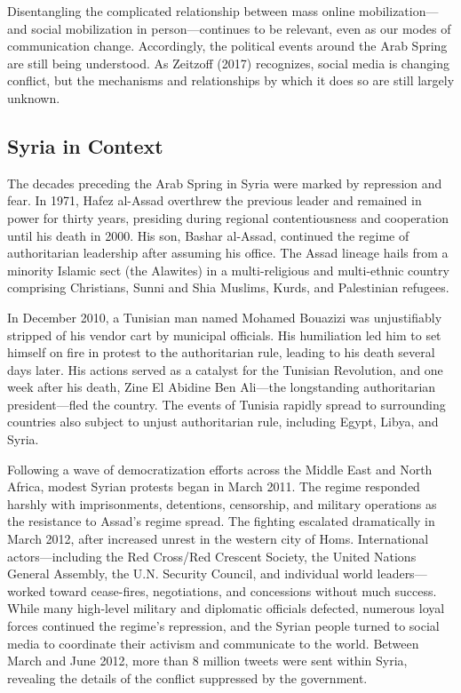 \documentclass[english,man]{apa6}
\begin{document}
Disentangling the complicated relationship between mass online
mobilization---and social mobilization in person---continues to be relevant,
even as our modes of communication change. Accordingly, the political events
around the Arab Spring are still being understood. As Zeitzoff
(2017) recognizes, social media is changing conflict, but the
mechanisms and relationships by which it does so are still largely unknown.

\hypertarget{syria-in-context}{%
\subsection{Syria in Context}\label{syria-in-context}}

The decades preceding the Arab Spring in Syria were marked by repression and
fear. In 1971, Hafez al-Assad overthrew the previous leader and remained in
power for thirty years, presiding during regional contentiousness and
cooperation until his death in 2000. His son, Bashar al-Assad, continued the
regime of authoritarian leadership after assuming his office. The Assad lineage
hails from a minority Islamic sect (the Alawites) in a multi-religious and
multi-ethnic country comprising Christians, Sunni and Shia Muslims, Kurds, and
Palestinian refugees.

In December 2010, a Tunisian man named Mohamed Bouazizi was unjustifiably
stripped of his vendor cart by municipal officials. His humiliation led him to
set himself on fire in protest to the authoritarian rule, leading to his death
several days later. His actions served as a catalyst for the Tunisian
Revolution, and one week after his death, Zine El Abidine Ben Ali---the
longstanding authoritarian president---fled the country. The events of Tunisia
rapidly spread to surrounding countries also subject to unjust authoritarian
rule, including Egypt, Libya, and Syria.

Following a wave of democratization efforts across the Middle East and North
Africa, modest Syrian protests began in March 2011. The regime responded harshly
with imprisonments, detentions, censorship, and military operations as the
resistance to Assad's regime spread. The fighting escalated dramatically in
March 2012, after increased unrest in the western city of Homs. International
actors---including the Red Cross/Red Crescent Society, the United Nations
General Assembly, the U.N. Security Council, and individual world
leaders---worked toward cease-fires, negotiations, and concessions without much
success. While many high-level military and diplomatic officials defected,
numerous loyal forces continued the regime's repression, and the Syrian people
turned to social media to coordinate their activism and communicate to the
world. Between March and June 2012, more than 8 million tweets were sent within
Syria, revealing the details of the conflict suppressed by the government.
\end{document}
